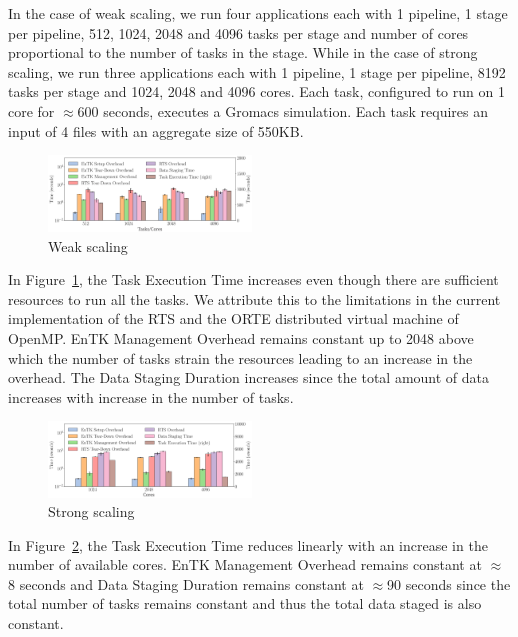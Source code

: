 In the case of weak scaling, we run four applications each with 1 pipeline, 1 
stage per pipeline, 512, 1024, 2048 and 4096 tasks per stage and number of cores
proportional to the number of tasks in the stage. While in the case of strong 
scaling, we run three applications each with 1 pipeline, 1 stage per pipeline, 
8192 tasks per stage and 1024, 2048 and 4096 cores. Each task, configured to
run on 1 core for \(\approx\)600 seconds, executes a Gromacs simulation. Each 
task requires an input of 4 files with an aggregate size of 550KB.
\begin{figure} 
\includegraphics[width=0.48\textwidth]{figs/weak_scaling_titan_orte_reduced.pdf}
\caption{Weak scaling}\label{fig:weak_scaling}
\end{figure}

In Figure~\ref{fig:weak_scaling}, the Task Execution Time increases even though
there are sufficient resources to run all the tasks. We attribute this to the
limitations in the current implementation of the RTS and the ORTE distributed 
virtual machine of OpenMP. EnTK Management Overhead remains constant up to 2048
above which the number of tasks strain the resources leading to an increase in
the overhead. The Data Staging Duration increases since the total amount of 
data increases with increase in the number of tasks.

\begin{figure} 
\includegraphics[width=0.48\textwidth]{figs/strong_scaling_titan_orte.pdf}
\caption{Strong scaling}\label{fig:strong_scaling}
\end{figure}

In Figure~\ref{fig:strong_scaling}, the Task Execution Time reduces linearly 
with an increase in the number of available cores. EnTK Management Overhead 
remains constant at \(\approx\)8 seconds and Data Staging Duration remains 
constant at \(\approx\)90 seconds since the total number of tasks remains
constant and thus the total data staged is also constant.


